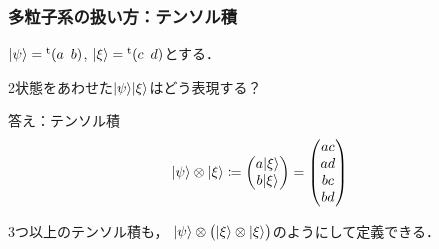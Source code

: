 \documentclass[
    10pt,
    ]{sotsu-beamer}
\begin{document}
\begin{frame}
    \frametitle{多粒子系の扱い方：テンソル積}

    $\ket{\psi} = \cvector{a ; b}$, $\ket{\xi} = \cvector{c ; d}$とする．

    2状態をあわせた$\lvert\psi\rangle\lvert\xi\rangle$はどう表現する？

    \pause

    答え：\alert{テンソル積}
    \begin{equation}
        \lvert\psi\rangle \otimes \lvert\xi\rangle
            \coloneq \begin{pmatrix}
                a \lvert\xi\rangle  \\  b \lvert\xi\rangle
            \end{pmatrix}
            = \begin{pmatrix}
                ac \\ ad \\ bc \\ bd
            \end{pmatrix}
    \end{equation}

    \pause

    3つ以上のテンソル積も，
    $\lvert\psi\rangle \otimes \bigl( \lvert\xi\rangle \otimes \lvert\xi\rangle \bigr)$のようにして定義できる．

\end{frame}
\end{document}
